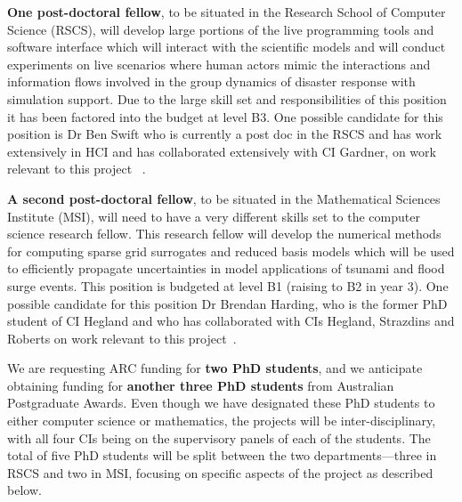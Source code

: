 \iffalse
Both Dr Jakeman and Dr Debusschere
have offered to host visits from our group to the Livermore and
Albuquerque Sandia Laboratories. We plan to support reciprocal visits
to ANU.
\fi

{\bf One post-doctoral fellow}, to be situated in the Research School
of Computer Science (RSCS), will develop large portions of the live
programming tools and software interface which will interact with the
scientific models and will conduct experiments on live scenarios where
human actors mimic the interactions and information flows involved in
the group dynamics of disaster response with simulation support. Due
to the large skill set and responsibilities of this position it has
been factored into the budget at level B3.  One possible candidate for
this position is Dr Ben Swift who is currently a post doc in the RSCS
and has work extensively in HCI and has collaborated extensively with
CI Gardner, on work relevant to this project
~\parencite{martin2015tracking,martin2016intelligent,swiftLive2016,
  swift2013visual,swift2014coding}.

{\bf A second post-doctoral fellow}, to be situated in the
Mathematical Sciences Institute (MSI), will need to have a very
different skills set to the computer science research fellow. This
research fellow will develop the numerical methods for computing
sparse grid surrogates and reduced basis models which will be used to
efficiently propagate uncertainties in model applications of tsunami
and flood surge events. This position is budgeted at level B1 (raising
to B2 in year 3).  One possible candidate for this position Dr Brendan Harding, who 
is the former PhD student of CI Hegland and who has
collaborated with CIs Hegland, Strazdins and Roberts on work
relevant to this project~\parencite{Ali11022016, AliEtal2015,
  deBaarHarding2015, HardingHLS2015, sgctalg15}.


We are requesting ARC funding for {\bf two PhD students}, and we anticipate
obtaining funding for {\bf another three PhD students} from Australian Postgraduate
Awards. Even though we have designated these PhD students to either
computer science or mathematics, the projects will be
inter-disciplinary, with all four CIs being on the supervisory panels
of each of the students. The {total of five PhD students} will be split between
the two departments—three in RSCS and two in MSI, focusing on specific
aspects of the project as described below.

\iffalse
. In RSCS, these will be the dynamic distributed
computing infrastructure and the development of live interfaces for
data visualisation. In the MSI, these will be the uncertainty
quantification and the development of numerical methods for the sparse
grid technique, and the reduced basis method, applied to our
inundation model example. 
\fi

